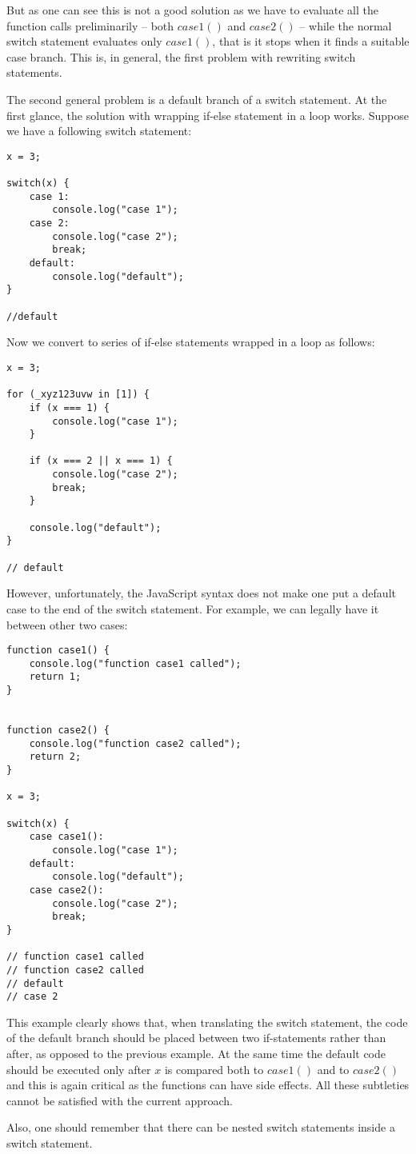 \documentclass[a4paper]{article}
\begin{document}
But as one can see this is not a good solution as we have to evaluate all the function calls preliminarily -- both $case1()$ and $case2()$ -- while the normal switch statement evaluates only $case1()$, that is it stops when it finds a suitable case branch. This is, in general, the first problem with rewriting switch statements.

The second general problem is a default branch of a switch statement. At the first glance, the solution with wrapping if-else statement in a loop works. Suppose we have a following switch statement:

\begin{lstlisting}
x = 3;

switch(x) {
    case 1: 
        console.log("case 1");
    case 2:
        console.log("case 2");	
        break;
    default: 
        console.log("default");
}

//default
\end{lstlisting} 

 Now we convert to series of if-else statements wrapped in a loop as follows:
 
\begin{lstlisting}
x = 3;

for (_xyz123uvw in [1]) {
    if (x === 1) { 
        console.log("case 1");
    }
	
    if (x === 2 || x === 1) {
        console.log("case 2");	
        break;
    }
	
    console.log("default");
}

// default
\end{lstlisting}
 
However, unfortunately, the JavaScript syntax does not make one put a default case to the end of the switch statement. For example, we can legally have it between other two cases:

\begin{lstlisting}
function case1() {
    console.log("function case1 called");
    return 1;
}


function case2() {
    console.log("function case2 called");
    return 2;
}

x = 3;

switch(x) {
	case case1(): 
		console.log("case 1");
	default: 
		console.log("default");
	case case2():
		console.log("case 2");	
		break;
}

// function case1 called
// function case2 called
// default
// case 2 
\end{lstlisting}

This example clearly shows that, when translating the switch statement, the code of the default branch should be placed between two if-statements rather than after, as opposed to the previous example. At the same time the default code should be executed only after $x$ is compared both to $case1()$ and to $case2()$ and this is again critical as the functions can have side effects. All these subtleties cannot be satisfied with the current approach.

Also, one should remember that there can be nested switch statements inside a switch statement.
\end{document}
